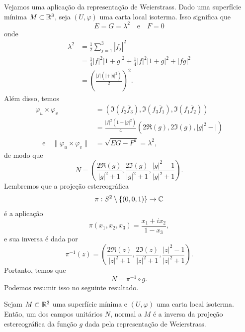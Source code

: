 \begin{exemplo}
	Vejamos uma aplicação da representação de Weierstrass. Dado uma superfície mínima $M \subset \mathbb{R}^3$, seja $(U, \varphi)$ uma carta local isoterma.
	Isso significa que
	\begin{equation*}
	E = G = \lambda^2 \quad \text{e} \quad
	F = 0
	\end{equation*}
	onde
	\begin{align*}
	\lambda^2 &= \frac{1}{2} \sum_{j=1}^{3} |f_j|^2 \\
	&= \frac{1}{4} |f|^2 |1 + g|^2 + \frac{1}{4} |f|^2 |1 + g|^2 + |fg|^2\\
	&= \left( \frac{|f| (| + |g|^2)}{2} \right)^2.
	\end{align*} 
	Além disso, temos
	\begin{align*}
	\varphi_u \times \varphi_v &= \left( \Im (f_2 \overline{f}_3), \Im (f_3 \overline{f}_1), \Im (f_1 \overline{f}_2) \right) \\
	&= \frac{|f|^2 (1 + |g|^2)}{4} \left( 2 \Re(g), 2 \Im(g), |g|^2 - | \right)\\
	\quad \text{e} \quad \| \varphi_u \times \varphi_v \| &= \sqrt{EG - F^2} = \lambda^2,
	\end{align*}
	de modo que
	\begin{equation*}
	N = \left( \frac{2 \Re(g)}{|g|^2 + 1}, \frac{2 \Im(g)}{|g|^2 + 1}, \frac{|g|^2 - 1}{|g|^2 + 1} \right).
	\end{equation*}
	Lembremos que a projeção estereográfica
	\begin{equation*}
	\pi: S^2 \setminus \{ (0,0,1) \} \rightarrow \mathbb{C}
	\end{equation*}
	é a aplicação
	\begin{equation*}
	\pi(x_1, x_2, x_3) = \frac{x_1 + ix_2}{1 - x_3},
	\end{equation*}
	e sua inversa é dada por
	\begin{equation*}
	\pi^{-1}(z) = \left( \frac{2 \Re(z)}{|z|^2 + 1}, \frac{2 \Im(z)}{|z|^2 + 1}, \frac{|z|^2 - 1}{|z|^2 + 1} \right).
	\end{equation*}
	Portanto, temos que
	\begin{equation}\label{eq:projecao-esterografica}
	N = \pi^{-1} \circ g.
	\end{equation}
	Podemos resumir isso no seguinte resultado.
\end{exemplo}

\begin{proposicao}
	Sejam $M \subset \mathbb{R}^3$ uma superfície mínima e $(U, \varphi)$ uma carta local isoterma. Então, um dos campos unitários $N$, normal a $M$ é a inversa da projeção estereográfica da função $g$ dada pela representação de Weierstrass.
\end{proposicao}

